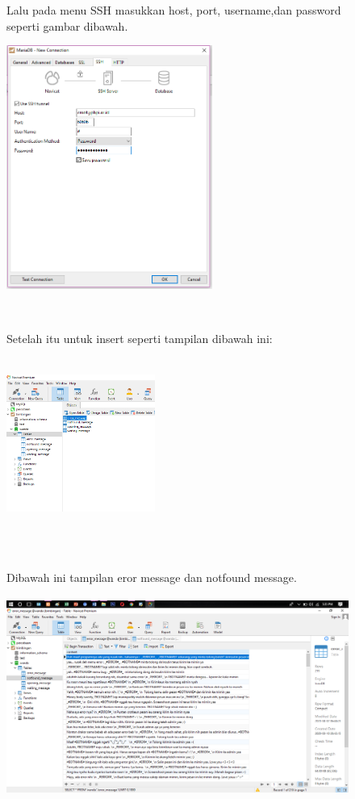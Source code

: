 \documentclass{book}
\begin{document}
\begin{enumerate}
\begin{figure} [ht]
    \end{figure} \begin{figure}
    \item Lalu pada menu SSH masukkan host, port, username,dan password seperti gambar dibawah.\\
    \centerline{\includegraphics [width=6.76cm, height=7.98cm]{figures/2.2.png}}\\
    \item Setelah itu untuk insert seperti tampilan dibawah ini:\\
    \centerline{\includegraphics [width=4.86cm, height=5.56cm]{figures/2.3.png}}\\
    \end{figure} \begin{figure}
    \item Dibawah ini tampilan eror message dan notfound message.\\
    \centerline{\includegraphics [width=11.62cm, height=6.53cm]{figures/2.4.png}}\\

\end{figure}
\end{enumerate}
\end{document}
